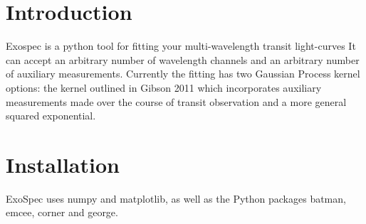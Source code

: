 \hypertarget{index_intro_sec}{}\section{Introduction}\label{index_intro_sec}
Exospec is a python tool for fitting your multi-\/wavelength transit light-\/curves It can accept an arbitrary number of wavelength channels and an arbitrary number of auxiliary measurements. Currently the fitting has two Gaussian Process kernel options\+: the kernel outlined in Gibson 2011 which incorporates auxiliary measurements made over the course of transit observation and a more general squared exponential. \hypertarget{index_install_sec}{}\section{Installation}\label{index_install_sec}
Exo\+Spec uses numpy and matplotlib, as well as the Python packages batman, emcee, corner and george. 